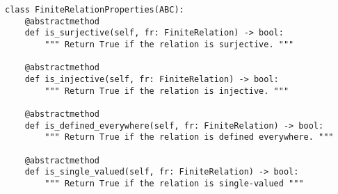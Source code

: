 \par\begin{minipage}{66ex}
\begin{verbatim}
class FiniteRelationProperties(ABC):
    @abstractmethod
    def is_surjective(self, fr: FiniteRelation) -> bool:
        """ Return True if the relation is surjective. """

    @abstractmethod
    def is_injective(self, fr: FiniteRelation) -> bool:
        """ Return True if the relation is injective. """

    @abstractmethod
    def is_defined_everywhere(self, fr: FiniteRelation) -> bool:
        """ Return True if the relation is defined everywhere. """

    @abstractmethod
    def is_single_valued(self, fr: FiniteRelation) -> bool:
        """ Return True if the relation is single-valued """
\end{verbatim}
\end{minipage}\par